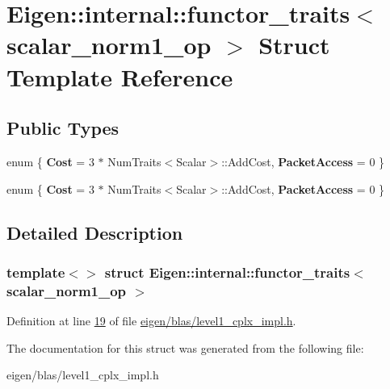 \hypertarget{struct_eigen_1_1internal_1_1functor__traits_3_01scalar__norm1__op_01_4}{}\section{Eigen\+:\+:internal\+:\+:functor\+\_\+traits$<$ scalar\+\_\+norm1\+\_\+op $>$ Struct Template Reference}
\label{struct_eigen_1_1internal_1_1functor__traits_3_01scalar__norm1__op_01_4}
\subsection*{Public Types}
\begin{DoxyCompactItemize}
\item 
\mbox{\label{struct_eigen_1_1internal_1_1functor__traits_3_01scalar__norm1__op_01_4_a2cc78a941bcc92fc745860d083754411}} 
enum \{ {\bfseries Cost} = 3 $\ast$ Num\+Traits$<$Scalar$>$\+:\+:Add\+Cost, 
{\bfseries Packet\+Access} = 0
 \}
\item 
\mbox{\label{struct_eigen_1_1internal_1_1functor__traits_3_01scalar__norm1__op_01_4_a8bf1f98506e47a902953043e6c2c3078}} 
enum \{ {\bfseries Cost} = 3 $\ast$ Num\+Traits$<$Scalar$>$\+:\+:Add\+Cost, 
{\bfseries Packet\+Access} = 0
 \}
\end{DoxyCompactItemize}


\subsection{Detailed Description}
\subsubsection*{template$<$$>$\newline
struct Eigen\+::internal\+::functor\+\_\+traits$<$ scalar\+\_\+norm1\+\_\+op $>$}



Definition at line \hyperlink{eigen_2blas_2level1__cplx__impl_8h_source_l00019}{19} of file \hyperlink{eigen_2blas_2level1__cplx__impl_8h_source}{eigen/blas/level1\+\_\+cplx\+\_\+impl.\+h}.



The documentation for this struct was generated from the following file\+:\begin{DoxyCompactItemize}
\item 
eigen/blas/level1\+\_\+cplx\+\_\+impl.\+h\end{DoxyCompactItemize}
